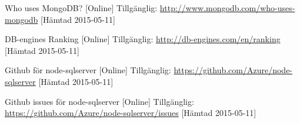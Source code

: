 \begin{thebibliography}{9}
Who uses MongoDB? [Online] Tillgänglig: 
\url{http://www.mongodb.com/who-uses-mongodb} [Hämtad 2015-05-11]

DB-engines Ranking [Online] Tillgänglig: 
\url{http://db-engines.com/en/ranking} [Hämtad 2015-05-11]

Github för node-sqlserver [Online] Tillgänglig:  
\url{https://github.com/Azure/node-sqlserver} [Hämtad 2015-05-11]

Github issues för node-sqlserver [Online] Tillgänglig: 
\url{https://github.com/Azure/node-sqlserver/issues} [Hämtad 2015-05-11]

\end{thebibliography}
